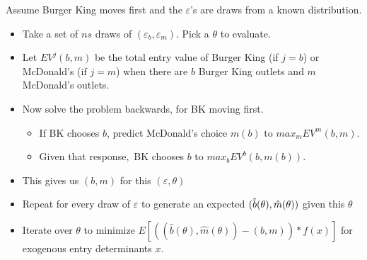 \begin{frame}%


Assume Burger King moves first and the $\varepsilon $'s are draws from a
known distribution.

\begin{itemize}
\item Take a set of $ns$ draws of $(\varepsilon _{b},\varepsilon _{m})$.
Pick a $\theta $ to evaluate.

\item Let $EV^{j}(b,m)$ be the total entry value of Burger King (if $j=b$)
or McDonald's (if $j=m$) when there are $b$ Burger King outlets and $m$
McDonald's outlets.

\item Now solve the problem backwards, for BK moving first.

\begin{itemize}
\item If BK chooses $b$, predict McDonald's choice $m(b)$ to $%
max_{m}EV^{m}(b,m)$.

\item Given that response,\ BK chooses $b$ to $max_{b}EV^{b}(b,m(b))$.
\end{itemize}

\item This gives us $(b,m)$ for this $(\varepsilon ,\theta )$

\item Repeat for every draw of $\varepsilon $ to generate an expected $(\hat{%
b}(\theta ),\hat{m}(\theta ))$ given this $\theta $

\item Iterate over $\theta $ to minimize $E[((\hat{b}(\theta ),\hat{m}%
(\theta ))-(b,m))\ast f(x)]$ for exogenous entry determinants $x$.
\end{itemize}

\end{frame}%

